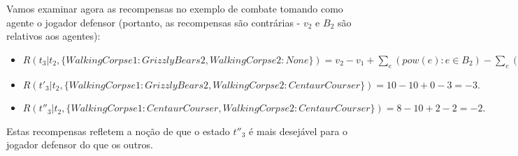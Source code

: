 \documentclass{book}
\begin{document}
\begin{itemize}
Vamos examinar agora as recompensas no exemplo de combate tomando como agente o jogador defensor (portanto, as recompensas são contrárias - $v_2$ e $B_2$ são relativos aos agentes):

\begin{itemize}
  \item $R(t_3 | t_2, \{WalkingCorpse1 : GrizzlyBears2, WalkingCorpse2 : None\}) = v_2 - v_1 + \sum\limits_e(pow(e) : e \in B_2) - \sum\limits_e(pow(e) : e \in B_1) = 7 - 10 + 2 - 5 = -6.$
  \item $R(t'_3| t_2, \{WalkingCorpse1 : GrizzlyBears2, WalkingCorpse2 : CentaurCourser\}) = 10 - 10 + 0 - 3 = -3.$
  \item $R(t''_3| t_2, \{WalkingCorpse1 : CentaurCourser, WalkingCorpse2 : CentaurCourser\}) = 8 - 10 + 2 - 2 = -2.$
\end{itemize}
Estas recompensas refletem a noção de que o estado $t''_3$ é mais desejável para o jogador defensor do que os outros.

\end{itemize}
\end{document}
